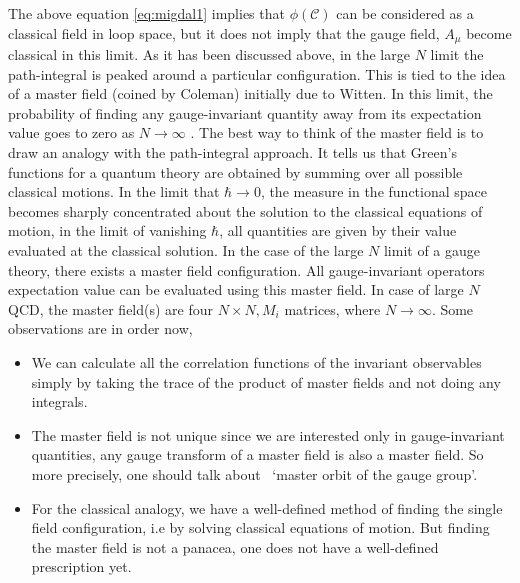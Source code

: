 The above equation \ref{eq:migdal1} implies that $ \phi(\mathcal{C})$ can be considered 
as a classical field in loop space, 
but it does not imply that the gauge field, $A_{\mu}$ become classical in this limit. 
As it has been discussed above, in the large $N$ limit the path-integral is peaked 
around a particular configuration. 
This is tied to the idea of a master field (coined by Coleman) initially due to Witten. 
In this limit, the probability of finding 
any gauge-invariant 
quantity away from its expectation value goes to zero as $N \to \infty$ 
\cite{Gopakumar:1994iq}.
The best way to think of the master field is to draw an analogy 
with the path-integral approach. 
It tells us that Green's functions for a quantum theory are obtained 
by summing over all possible classical motions. 
In the limit that $\hbar \to 0$, the measure in the functional space 
becomes sharply concentrated about the solution to
 the classical equations of motion, in the limit of vanishing $\hbar$, 
all quantities are given by their value evaluated at the classical solution. 
In the case of the large $N$ limit of a gauge theory, there exists a 
master field configuration. 
All gauge-invariant operators expectation value can be evaluated using this master field. 
In case of large $N$ QCD, the master field(s) are four $N \times N, 
M_{i}$ matrices, where $N \to \infty$.  
Some observations are in order now,  

\begin{itemize}
\item We can calculate all the correlation functions of the invariant 
observables simply by taking the trace of the product of master fields and not doing any integrals. 
\item The master field is not unique since we are interested only in 
gauge-invariant quantities, any gauge transform of a master field is also a master field. 
So more precisely, one should talk about ~`master orbit of the gauge 
group'. 
\item For the classical analogy, we have a well-defined method of 
finding the single field configuration, i.e by solving classical equations of motion. 
But finding the master field is not a panacea, one does not have a well-defined prescription yet.
\end{itemize}   


